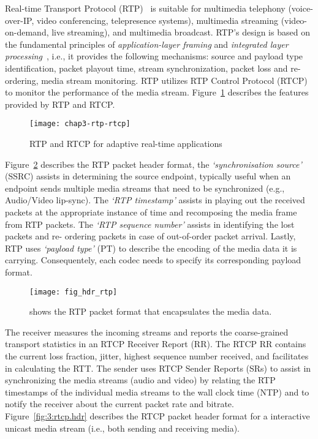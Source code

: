 
Real-time Transport Protocol (RTP)~\cite{rfc3550} is suitable for multimedia
telephony (voice-over-IP, video conferencing, telepresence systems),
multimedia streaming (video-on-demand, live streaming), and multimedia
broadcast. RTP's design is based on the fundamental principles of \textit
{application-layer framing} and \textit{integrated layer
processing}~\cite{clark:alf}, i.e., it provides the following mechanisms:
source and payload type identification, packet playout time, stream
synchronization, packet loss and re-ordering, media stream monitoring. RTP
utilizes RTP Control Protocol (RTCP) to monitor the performance of the media
stream. Figure~\ref{fig:3:rtp:model} describes the features provided by RTP
and RTCP.

\begin{figure}[!h]
\centerline{\texttt{[image: chap3-rtp-rtcp]}}
\caption{RTP and RTCP for adaptive real-time applications}
\label{fig:3:rtp:model}
\end{figure}

Figure~\ref{fig:3:rtp.hdr} describes the RTP packet header format, the
\textit{`synchronisation source'} (SSRC) assists in determining the source
endpoint, typically useful when an endpoint sends multiple media streams that
need to be synchronized (e.g., Audio/Video lip-sync). The \textit{`RTP
timestamp'} assists in playing out the received packets at the appropriate
instance of time and recomposing the media frame from RTP packets. The
\textit{`RTP sequence number'} assists in identifying the lost packets and re-
ordering packets in case of out-of-order packet arrival. Lastly, RTP uses
\textit{`payload type'} (PT) to describe the encoding of the media data it is
carrying. Consequentely, each codec needs to specify its corresponding payload
format.

\begin{figure}[!h]
\centerline{\texttt{[image: fig\_hdr\_rtp]}}
\caption{shows the RTP packet format that encapsulates the media data.}
\label{fig:3:rtp.hdr}
\end{figure}

The receiver measures the incoming streams and reports the coarse-grained
transport statistics in an RTCP Receiver Report (RR). The RTCP RR contains the
current loss fraction, jitter, highest sequence number received, and
facilitates in calculating the RTT. The sender uses RTCP Sender Reports (SRs)
to assist in synchronizing the media streams (audio and video) by relating the
RTP timestamps of the individual media streams to the wall clock time (NTP)
and to notify the receiver about the current packet rate and bitrate.
Figure~\ref{fig:3:rtcp.hdr} describes the RTCP packet header format for a
interactive unicast media stream (i.e., both sending and receiving media).

